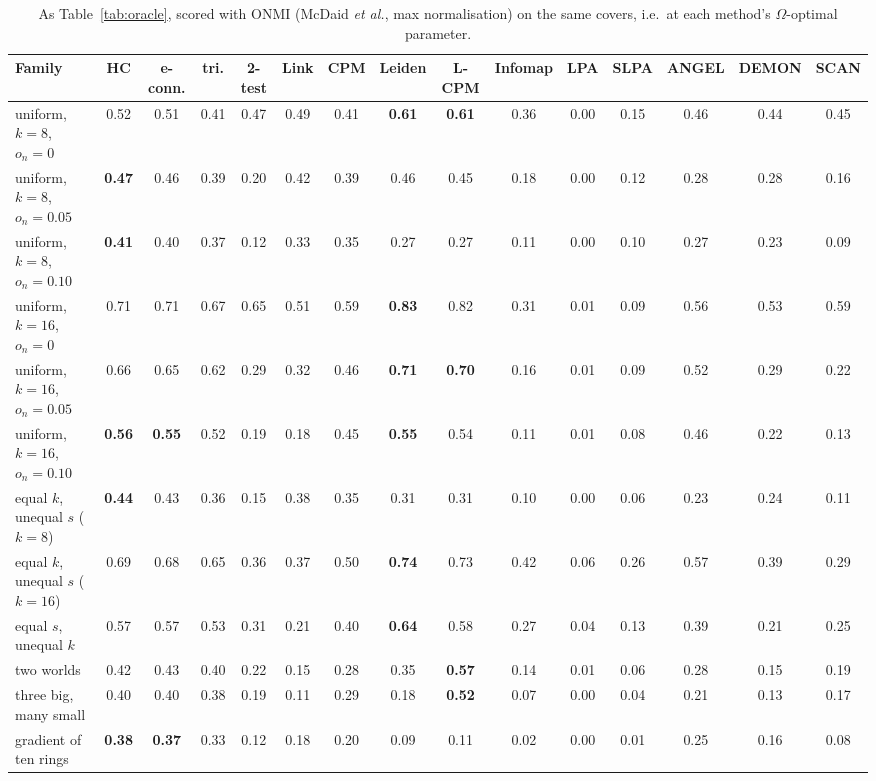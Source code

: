 \begin{table}[t]
\caption{As Table~\ref{tab:oracle}, scored with ONMI (McDaid \emph{et al.}, max normalisation) on the same covers, i.e.\ at each method's $\Omega$-optimal parameter.}
\label{tab:onmi}
\scriptsize\setlength{\tabcolsep}{2pt}
\begin{ruledtabular}
\begin{tabular}{lcccccccccccccc}
Family & HC & e-conn. & tri. & 2-test & Link & CPM & Leiden & L-CPM & Infomap & LPA & SLPA & ANGEL & DEMON & SCAN \\
\hline
uniform, $k{=}8$, $o_n{=}0$ & 0.52 & 0.51 & 0.41 & 0.47 & 0.49 & 0.41 & \textbf{0.61} & \textbf{0.61} & 0.36 & 0.00 & 0.15 & 0.46 & 0.44 & 0.45 \\
uniform, $k{=}8$, $o_n{=}0.05$ & \textbf{0.47} & 0.46 & 0.39 & 0.20 & 0.42 & 0.39 & 0.46 & 0.45 & 0.18 & 0.00 & 0.12 & 0.28 & 0.28 & 0.16 \\
uniform, $k{=}8$, $o_n{=}0.10$ & \textbf{0.41} & 0.40 & 0.37 & 0.12 & 0.33 & 0.35 & 0.27 & 0.27 & 0.11 & 0.00 & 0.10 & 0.27 & 0.23 & 0.09 \\
uniform, $k{=}16$, $o_n{=}0$ & 0.71 & 0.71 & 0.67 & 0.65 & 0.51 & 0.59 & \textbf{0.83} & 0.82 & 0.31 & 0.01 & 0.09 & 0.56 & 0.53 & 0.59 \\
uniform, $k{=}16$, $o_n{=}0.05$ & 0.66 & 0.65 & 0.62 & 0.29 & 0.32 & 0.46 & \textbf{0.71} & \textbf{0.70} & 0.16 & 0.01 & 0.09 & 0.52 & 0.29 & 0.22 \\
uniform, $k{=}16$, $o_n{=}0.10$ & \textbf{0.56} & \textbf{0.55} & 0.52 & 0.19 & 0.18 & 0.45 & \textbf{0.55} & 0.54 & 0.11 & 0.01 & 0.08 & 0.46 & 0.22 & 0.13 \\
\hline
equal $k$, unequal $s$ ($k{=}8$) & \textbf{0.44} & 0.43 & 0.36 & 0.15 & 0.38 & 0.35 & 0.31 & 0.31 & 0.10 & 0.00 & 0.06 & 0.23 & 0.24 & 0.11 \\
equal $k$, unequal $s$ ($k{=}16$) & 0.69 & 0.68 & 0.65 & 0.36 & 0.37 & 0.50 & \textbf{0.74} & 0.73 & 0.42 & 0.06 & 0.26 & 0.57 & 0.39 & 0.29 \\
equal $s$, unequal $k$ & 0.57 & 0.57 & 0.53 & 0.31 & 0.21 & 0.40 & \textbf{0.64} & 0.58 & 0.27 & 0.04 & 0.13 & 0.39 & 0.21 & 0.25 \\
two worlds & 0.42 & 0.43 & 0.40 & 0.22 & 0.15 & 0.28 & 0.35 & \textbf{0.57} & 0.14 & 0.01 & 0.06 & 0.28 & 0.15 & 0.19 \\
three big, many small & 0.40 & 0.40 & 0.38 & 0.19 & 0.11 & 0.29 & 0.18 & \textbf{0.52} & 0.07 & 0.00 & 0.04 & 0.21 & 0.13 & 0.17 \\
gradient of ten rings & \textbf{0.38} & \textbf{0.37} & 0.33 & 0.12 & 0.18 & 0.20 & 0.09 & 0.11 & 0.02 & 0.00 & 0.01 & 0.25 & 0.16 & 0.08 \\

\end{tabular}
\end{ruledtabular}
\end{table}
